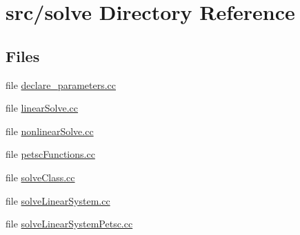 \section{src/solve Directory Reference}
\label{dir_08d6cd1c1b635c58e6a2b0d281bf2cad}
\subsection*{Files}
\begin{DoxyCompactItemize}
\item 
file \mbox{\hyperlink{declare__parameters_8cc}{declare\+\_\+parameters.\+cc}}
\item 
file \mbox{\hyperlink{linear_solve_8cc}{linear\+Solve.\+cc}}
\item 
file \mbox{\hyperlink{nonlinear_solve_8cc}{nonlinear\+Solve.\+cc}}
\item 
file \mbox{\hyperlink{petsc_functions_8cc}{petsc\+Functions.\+cc}}
\item 
file \mbox{\hyperlink{solve_class_8cc}{solve\+Class.\+cc}}
\item 
file \mbox{\hyperlink{solve_linear_system_8cc}{solve\+Linear\+System.\+cc}}
\item 
file \mbox{\hyperlink{solve_linear_system_petsc_8cc}{solve\+Linear\+System\+Petsc.\+cc}}
\end{DoxyCompactItemize}
